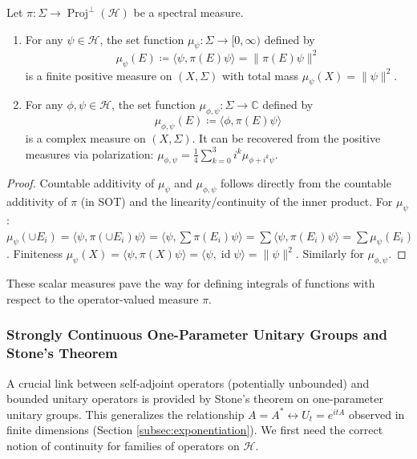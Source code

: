 \begin{proposition}
Let $\pi: \Sigma \to \operatorname{Proj}^{\perp}(\mathcal{H})$ be a spectral measure.
\begin{enumerate}
    \item For any $\psi \in \mathcal{H}$, the set function $\mu_\psi: \Sigma \to [0, \infty)$ defined by
        \[ \mu_\psi(E) \coloneqq \langle \psi, \pi(E)\psi \rangle = \|\pi(E)\psi\|^2 \]
        is a finite positive measure on $(X, \Sigma)$ with total mass $\mu_\psi(X) = \|\psi\|^2$.
    \item For any $\phi, \psi \in \mathcal{H}$, the set function $\mu_{\phi,\psi}: \Sigma \to \mathbb{C}$ defined by
        \[ \mu_{\phi,\psi}(E) \coloneqq \langle \phi, \pi(E)\psi \rangle \]
        is a complex measure on $(X, \Sigma)$. It can be recovered from the positive measures via polarization: $\mu_{\phi,\psi} = \frac{1}{4} \sum_{k=0}^3 i^k \mu_{\phi+i^k\psi}$.
\end{enumerate}
\end{proposition}
\begin{proof}
Countable additivity of $\mu_\psi$ and $\mu_{\phi,\psi}$ follows directly from the countable additivity of $\pi$ (in SOT) and the linearity/continuity of the inner product. For $\mu_\psi$: $\mu_\psi(\cup E_i) = \langle \psi, \pi(\cup E_i)\psi \rangle = \langle \psi, \sum \pi(E_i)\psi \rangle = \sum \langle \psi, \pi(E_i)\psi \rangle = \sum \mu_\psi(E_i)$. Finiteness $\mu_\psi(X) = \langle \psi, \pi(X)\psi \rangle = \langle \psi, \operatorname{id}\psi \rangle = \|\psi\|^2$. Similarly for $\mu_{\phi,\psi}$.
\end{proof}
These scalar measures pave the way for defining integrals of functions with respect to the operator-valued measure $\pi$.

\subsubsection{Strongly Continuous One-Parameter Unitary Groups and Stone's Theorem}
\label{subsec:stone}

A crucial link between self-adjoint operators (potentially unbounded) and bounded unitary operators is provided by Stone's theorem on one-parameter unitary groups. This generalizes the relationship $A=A^* \leftrightarrow U_t = e^{itA}$ observed in finite dimensions (Section \ref{subsec:exponentiation}). We first need the correct notion of continuity for families of operators on $\mathcal{H}$.


